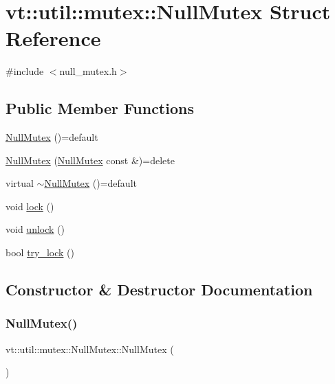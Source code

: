 \hypertarget{structvt_1_1util_1_1mutex_1_1_null_mutex}{}\section{vt\+:\+:util\+:\+:mutex\+:\+:Null\+Mutex Struct Reference}
\label{structvt_1_1util_1_1mutex_1_1_null_mutex}


{\ttfamily \#include $<$null\+\_\+mutex.\+h$>$}

\subsection*{Public Member Functions}
\begin{DoxyCompactItemize}
\item 
\hyperlink{structvt_1_1util_1_1mutex_1_1_null_mutex_a83dc2b0c0d0b3b2ff4896352d669623b}{Null\+Mutex} ()=default
\item 
\hyperlink{structvt_1_1util_1_1mutex_1_1_null_mutex_aec62ba43a3e6e4e869da7408930e2f6c}{Null\+Mutex} (\hyperlink{structvt_1_1util_1_1mutex_1_1_null_mutex}{Null\+Mutex} const \&)=delete
\item 
virtual \hyperlink{structvt_1_1util_1_1mutex_1_1_null_mutex_a09433197f2e0967c72fc9e77e514fcfb}{$\sim$\+Null\+Mutex} ()=default
\item 
void \hyperlink{structvt_1_1util_1_1mutex_1_1_null_mutex_a491a89387a3cb2cc096b5b9d95726478}{lock} ()
\item 
void \hyperlink{structvt_1_1util_1_1mutex_1_1_null_mutex_ac87de5bb43fd843c2f3fcf3f66d130df}{unlock} ()
\item 
bool \hyperlink{structvt_1_1util_1_1mutex_1_1_null_mutex_a12001b9a741d4cf8777cd0caf8e2084f}{try\+\_\+lock} ()
\end{DoxyCompactItemize}


\subsection{Constructor \& Destructor Documentation}
\mbox{\label{structvt_1_1util_1_1mutex_1_1_null_mutex_a83dc2b0c0d0b3b2ff4896352d669623b}} 
\subsubsection{\texorpdfstring{Null\+Mutex()}{NullMutex()}\hspace{0.1cm}{\footnotesize\ttfamily [1/2]}}
{\footnotesize\ttfamily vt\+::util\+::mutex\+::\+Null\+Mutex\+::\+Null\+Mutex (\begin{DoxyParamCaption}{ }\end{DoxyParamCaption})\hspace{0.3cm}{\ttfamily [default]}}

